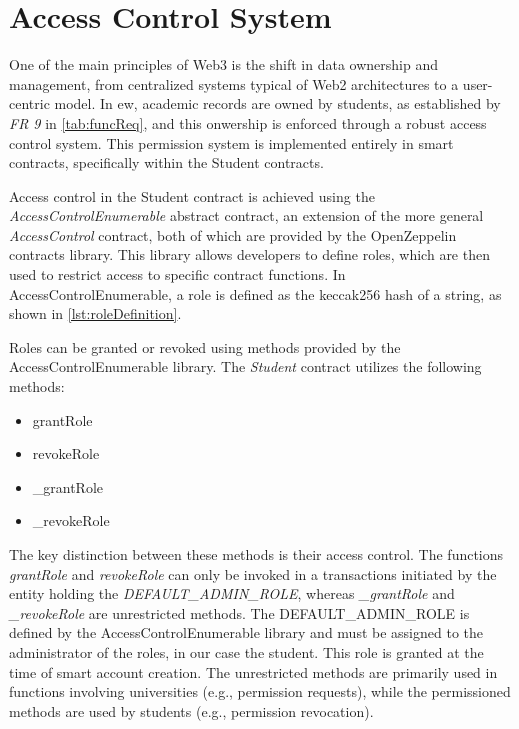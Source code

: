 \section{Access Control System}
One of the main principles of Web3 is the shift in data ownership and management, from centralized systems typical of Web2 architectures to a user-centric model. In \acrlong{ew}, academic records are owned by students, as established by \textit{FR 9} in \cref{tab:funcReq}, and this onwership is enforced through a robust access control system. This permission system is implemented entirely in smart contracts, specifically within the Student contracts.

Access control in the Student contract is achieved using the \textit{AccessControlEnumerable} abstract contract, an extension of the more general \textit{AccessControl} contract, both of which are provided by the OpenZeppelin contracts library. This library allows developers to define roles, which are then used to restrict access to specific contract functions. In AccessControlEnumerable, a role is defined as the \Gls{keccak256} \gls{hash} of a string, as shown in \cref{lst:roleDefinition}.


Roles can be granted or revoked using methods provided by the AccessControlEnumerable library. The \textit{Student} contract utilizes the following methods:
\begin{itemize}
    \item grantRole
    \item revokeRole
    \item \_grantRole
    \item \_revokeRole
\end{itemize}
The key distinction between these methods is their access control. The functions \textit{grantRole} and \textit{revokeRole} can only be invoked in a transactions initiated by the entity holding the \textit{DEFAULT\_ADMIN\_ROLE}, whereas \textit{\_grantRole} and \textit{\_revokeRole} are unrestricted methods. The DEFAULT\_ADMIN\_ROLE is defined by the AccessControlEnumerable library and must be assigned to the administrator of the roles, in our case the student. This role is granted at the time of smart account creation. The unrestricted methods are primarily used in functions involving universities (e.g., permission requests), while the permissioned methods are used by students (e.g., permission revocation).

